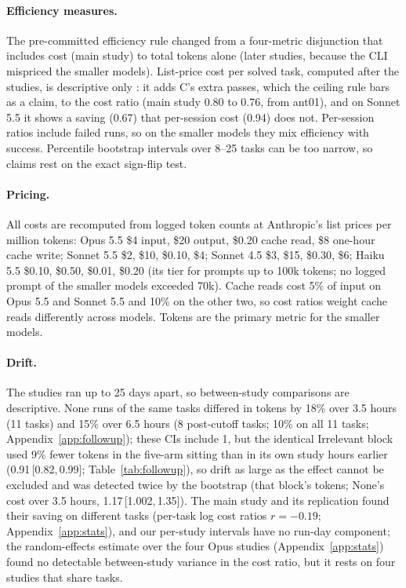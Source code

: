 \documentclass[11pt]{article}
\newcommand{\ci}[2]{\,[#1,\,#2]}
\newcommand{\aNone}{\textsf{None}\xspace}
\newcommand{\aIrr}{\textsf{Irrelevant}\xspace}
\begin{document}
\paragraph{Efficiency measures.} The pre-committed efficiency rule changed from a four-metric disjunction that includes cost (main study) to total tokens alone (later studies, because the CLI mispriced the smaller models). List-price cost per solved task, computed after the studies, is descriptive only \citep{weinberger2026waste}: it adds C's extra passes, which the ceiling rule bars as a claim, to the cost ratio (main study 0.80 to 0.76, from ant01), and on Sonnet 5.5 it shows a saving (0.67) that per-session cost (0.94) does not. Per-session ratios include failed runs, so on the smaller models they mix efficiency with success. Percentile bootstrap intervals over 8--25 tasks can be too narrow, so claims rest on the exact sign-flip test.

\paragraph{Pricing.} All costs are recomputed from logged token counts at Anthropic's list prices per million tokens: Opus 5.5 \$4 input, \$20 output, \$0.20 cache read, \$8 one-hour cache write; Sonnet 5.5 \$2, \$10, \$0.10, \$4; Sonnet 4.5 \$3, \$15, \$0.30, \$6; Haiku 5.5 \$0.10, \$0.50, \$0.01, \$0.20 (its tier for prompts up to 100k tokens; no logged prompt of the smaller models exceeded 70k). Cache reads cost 5\% of input on Opus 5.5 and Sonnet 5.5 and 10\% on the other two, so cost ratios weight cache reads differently across models. Tokens are the primary metric for the smaller models.

\paragraph{Drift.} The studies ran up to 25 days apart, so between-study comparisons are descriptive. \aNone runs of the same tasks differed in tokens by 18\% over 3.5 hours (11 tasks) and 15\% over 6.5 hours (8 post-cutoff tasks; 10\% on all 11 tasks; Appendix~\ref{app:followup}); these CIs include 1, but the identical \aIrr block used 9\% fewer tokens in the five-arm sitting than in its own study hours earlier (0.91\ci{0.82}{0.99}; Table~\ref{tab:followup}), so drift as large as the effect cannot be excluded and was detected twice by the bootstrap (that block's tokens; \aNone's cost over 3.5 hours, 1.17\ci{1.002}{1.35}). The main study and its replication found their saving on different tasks (per-task log cost ratios $r = -0.19$; Appendix~\ref{app:stats}), and our per-study intervals have no run-day component; the random-effects estimate over the four Opus studies (Appendix~\ref{app:stats}) found no detectable between-study variance in the cost ratio, but it rests on four studies that share tasks.
\end{document}
